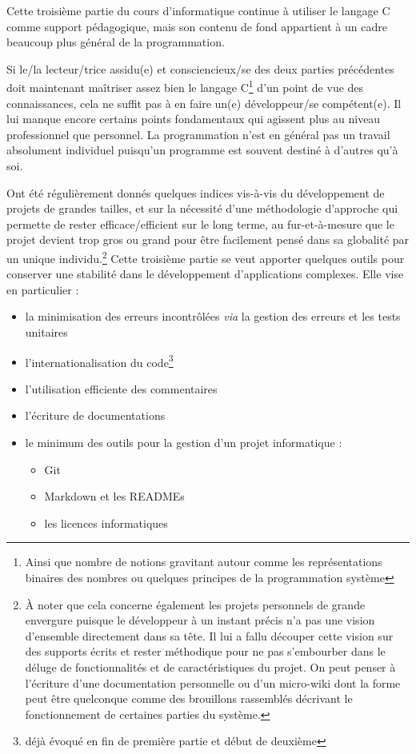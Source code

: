 \documentclass[../../main.tex]{subfiles}
\begin{document}
Cette troisième partie du cours d'informatique continue à utiliser le langage C comme support pédagogique, mais son contenu de fond appartient à un cadre beaucoup plus général de la programmation.
 
Si le/la lecteur/trice assidu(e) et consciencieux/se des deux parties précédentes doit maintenant maîtriser assez bien le langage C\footnote{Ainsi que nombre de notions gravitant autour comme les représentations binaires des nombres ou quelques principes de la programmation système} d'un point de vue des connaissances, cela ne suffit pas à en faire un(e) développeur/se compétent(e). Il lui manque encore certains points fondamentaux qui agissent plus au niveau professionnel que personnel. La programmation n'est en général pas un travail absolument individuel puisqu'un programme est souvent destiné à d'autres qu'à soi.

Ont été régulièrement donnés quelques indices vis-à-vis du développement de projets de grandes tailles, et sur la nécessité d'une méthodologie d'approche qui permette de rester efficace/efficient sur le long terme, au fur-et-à-mesure que le projet devient trop gros ou grand pour être facilement pensé dans sa globalité par un unique individu.\footnote{À noter que cela concerne également les projets personnels de grande envergure puisque le développeur à un instant précis n'a pas une vision d'ensemble directement dans sa tête. Il lui a fallu découper cette vision sur des supports écrits et rester méthodique pour ne pas s'embourber dans le déluge de fonctionnalités et de caractéristiques du projet. On peut penser à l'écriture d'une documentation personnelle ou d'un micro-wiki dont la forme peut être quelconque comme des brouillons rassemblés décrivant le fonctionnement de certaines parties du système.} Cette troisième partie se veut apporter quelques outils pour conserver une stabilité dans le développement d'applications complexes. Elle vise en particulier :
\begin{itemize}
	\item la minimisation des erreurs incontrôlées \textit{via} la gestion des erreurs et les tests unitaires
	\item l'internationalisation du code\footnote{déjà évoqué en fin de première partie et début de deuxième}
	\item l'utilisation efficiente des commentaires
	\item l'écriture de documentations
	\item le minimum des outils pour la gestion d'un projet informatique :
		\begin{itemize}
			\item Git
			\item Markdown et les READMEs
			\item les licences informatiques
		\end{itemize}
\end{itemize}
\hrulefill
\newpage
\end{document}
